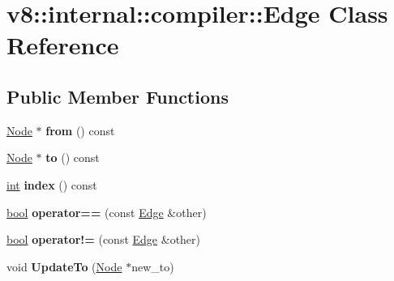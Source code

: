 \hypertarget{classv8_1_1internal_1_1compiler_1_1Edge}{}\section{v8\+:\+:internal\+:\+:compiler\+:\+:Edge Class Reference}
\label{classv8_1_1internal_1_1compiler_1_1Edge}
\subsection*{Public Member Functions}
\begin{DoxyCompactItemize}
\item 
\mbox{\label{classv8_1_1internal_1_1compiler_1_1Edge_a0be5aa196eb5922ccb5e84f1031c6840}} 
\mbox{\hyperlink{classv8_1_1internal_1_1compiler_1_1Node}{Node}} $\ast$ {\bfseries from} () const
\item 
\mbox{\label{classv8_1_1internal_1_1compiler_1_1Edge_a2092ce070d7c5c7ea16c6a66bb700e91}} 
\mbox{\hyperlink{classv8_1_1internal_1_1compiler_1_1Node}{Node}} $\ast$ {\bfseries to} () const
\item 
\mbox{\label{classv8_1_1internal_1_1compiler_1_1Edge_a9397be7b7134b1d3a96f68ad98d9bead}} 
\mbox{\hyperlink{classint}{int}} {\bfseries index} () const
\item 
\mbox{\label{classv8_1_1internal_1_1compiler_1_1Edge_a7a782489563606761083e110bafde54e}} 
\mbox{\hyperlink{classbool}{bool}} {\bfseries operator==} (const \mbox{\hyperlink{classv8_1_1internal_1_1compiler_1_1Edge}{Edge}} \&other)
\item 
\mbox{\label{classv8_1_1internal_1_1compiler_1_1Edge_a9c6ebd00064b7a43e2b15e55b2967eac}} 
\mbox{\hyperlink{classbool}{bool}} {\bfseries operator!=} (const \mbox{\hyperlink{classv8_1_1internal_1_1compiler_1_1Edge}{Edge}} \&other)
\item 
\mbox{\label{classv8_1_1internal_1_1compiler_1_1Edge_ac4eb4e39211896db0cfe7786ab1c7abc}} 
void {\bfseries Update\+To} (\mbox{\hyperlink{classv8_1_1internal_1_1compiler_1_1Node}{Node}} $\ast$new\+\_\+to)
\end{DoxyCompactItemize}
